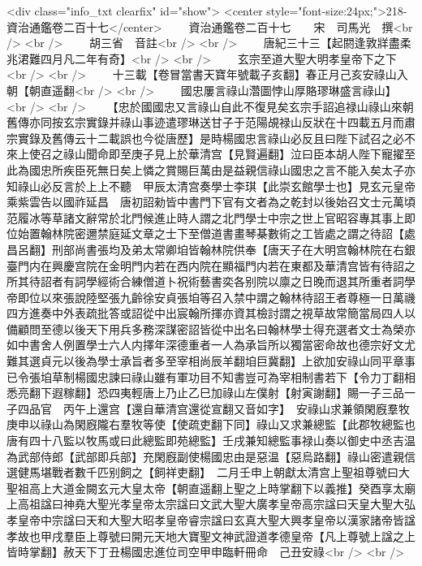 <div class="info_txt clearfix" id="show">
<center style="font-size:24px;">218-資治通鑑卷二百十七</center>
  　　資治通鑑卷二百十七　　宋　司馬光　撰<br />
<br />
　　胡三省　音註<br />
<br />
　　唐紀三十三【起閼逢敦牂盡柔兆涒難四月凡二年有奇】<br />
<br />
　　玄宗至道大聖大明孝皇帝下之下<br />
<br />
　　十三載【卷冒當書天寶年號載子亥翻】春正月己亥安祿山入朝【朝直遥翻<br />
<br />
　　國忠屢言祿山濳圖悖山厚賂璆琳盛言祿山】<br />
<br />
　　【忠於國國忠又言祿山自此不復見矣玄宗手詔追禄山祿山來朝舊傳亦同按玄宗實錄并祿山事迹遣璆琳送甘子于范陽覘禄山反狀在十四載五月而肅宗實錄及舊傳云十二載誤也今從唐歷】是時楊國忠言祿山必反且曰陛下試召之必不來上使召之祿山聞命即至庚子見上於華清宫【見賢遍翻】泣曰臣本胡人陛下寵擢至此為國忠所疾臣死無日矣上憐之賞賜巨萬由是益親信祿山國忠之言不能入矣太子亦知祿山必反言於上上不聽　甲辰太清宫奏學士李琪【此崇玄館學士也】見玄元皇帝乘紫雲告以國祚延昌　唐初詔勑皆中書門下官有文者為之乾封以後始召文士元萬頃范履冰等草諸文辭常於北門候進止時人謂之北門學士中宗之世上官昭容專其事上即位始置翰林院密邇禁庭延文章之士下至僧道書畫琴棊數術之工皆處之謂之待詔【處昌呂翻】刑部尚書張均及弟太常卿垍皆翰林院供奉【唐天子在大明宫翰林院在右銀臺門内在興慶宫院在金明門内若在西内院在顯福門内若在東都及華清宫皆有待詔之所其待詔者有詞學經術合練僧道卜祝術藝書奕各别院以廪之日晚而退其所重者詞學帝即位以來張說陸堅張九齡徐安貞張垍等召入禁中謂之翰林待詔王者尊極一日萬禨四方進奏中外表疏批答或詔從中出宸翰所揮亦資其檢討謂之視草故常簡當局四人以備顧問至德以後天下用兵多務深謀密詔皆從中出名曰翰林學士得充選者文士為榮亦如中書舍人例置學士六人内擇年深德重者一人為承旨所以獨當密命故也德宗好文尤難其選貞元以後為學士承旨者多至宰相尚辰羊翻垍巨冀翻】上欲加安祿山同平章事已令張垍草制楊國忠諫曰祿山雖有軍功目不知書豈可為宰相制書若下【令力丁翻相悉亮翻下遐稼翻】恐四夷輕唐上乃止乙巳加祿山左僕射【射寅謝翻】賜一子三品一子四品官　丙午上還宫【還自華清宫還從宣翻又音如字】　安祿山求兼領閑廐羣牧庚申以祿山為閑廐隴右羣牧等使【使疏吏翻下同】祿山又求兼總監【此郡牧總監也唐有四十八監以牧馬或曰此總監即苑總監】壬戌兼知總監事禄山奏以御史中丞吉温為武部侍郎【武部即兵部】充閑廐副使楊國忠由是惡温【惡烏路翻】祿山密遣親信選健馬堪戰者數千匹别飼之【飼祥吏翻】　二月壬申上朝獻太清宫上聖祖尊號曰大聖祖高上大道金闕玄元大皇太帝【朝直遥翻上聖之上時掌翻下以義推】癸酉享太廟上高祖諡曰神堯大聖光孝皇帝太宗諡曰文武大聖大廣孝皇帝高宗諡曰天皇大聖大弘孝皇帝中宗諡曰天和大聖大昭孝皇帝睿宗諡曰玄真大聖大興孝皇帝以漢家諸帝皆諡孝故也甲戌羣臣上尊號曰開元天地大寶聖文神武證道孝德皇帝【凡上尊號上諡之上皆時掌翻】赦天下丁丑楊國忠進位司空甲申臨軒冊命　己丑安祿<br />
<br />
